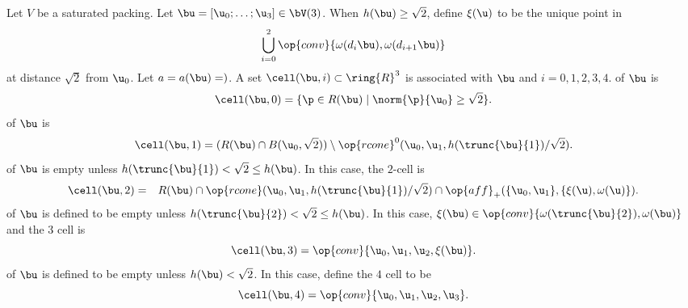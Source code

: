 \begin{definition} 
  Let $V$ be a saturated packing.  Let $\bu=[\u_0;\ldots;\u_3]\in
  \bV(3)$.  When $h(\bu)\ge\sqrt2$, define $\xi(\u)$
  to be the unique point in
\[
\bigcup_{i=0}^2 \op{conv}\{\omega(d_i\bu),\omega(d_{i+1}\bu)\}
\]
at distance $\sqrt2$ from $\u_0$.  Let $a=a(\bu)=)$.
A set $\cell(\bu,i)\subset\ring{R}^3$ is associated with $\bu$ and $i=0,1,2,3,4$.  
\hfill\break\smallskip 
{} of $\bu$
is
\begin{displaymath} 
\cell(\bu,0) = \{\p\in R(\bu) \mid \norm{\p}{\u_0} \ge \sqrt2\}.
\end{displaymath}
\bigskip
{} of $\bu$ is 
\begin{displaymath} 
\cell(\bu,1) = (R(\bu) \cap B(\u_0,\sqrt2))\setminus \op{rcone}^0(\u_0,\u_1,{h(\trunc{\bu}{1})}/{\sqrt2}).
\end{displaymath}
\bigskip
{} of $\bu$ is
empty unless $h(\trunc{\bu}{1})<\sqrt2\le h(\bu)$.  In this case, the $2$-cell is
\begin{eqnarray*} 
\cell(\bu,2) &=& 
R(\bu) \cap \op{rcone}(\u_0,\u_1,{h(\trunc{\bu}{1})}/{\sqrt2})\cap \op{aff}_+(\{\u_0,\u_1\},\{\xi(\u),\omega(\u)\}).
\end{eqnarray*}
\bigskip
{} of $\bu$ is defined to be empty unless 
$h(\trunc{\bu}{2}) <\sqrt2 \le h(\bu)$.
In this case, $\xi(\bu)\in \op{conv}\{\omega(\trunc{\bu}{2}),\omega(\bu)\}$
and  the $3$ cell is
\begin{displaymath} 
\cell(\bu,3) = \op{conv}\{ \u_0, \u_1, \u_2,\xi(\bu)\}.
\end{displaymath}
\bigskip
{} of $\bu$ is defined to be empty unless
$h(\bu) <\sqrt2$.
In this case, define the $4$ cell to be
\begin{displaymath} 
\cell(\bu,4) = \op{conv}\{ \u_0, \u_1, \u_2, \u_3\}.
\end{displaymath}
\end{definition}
%

